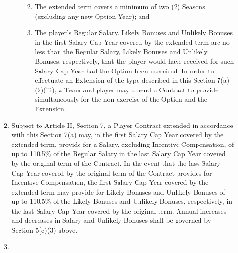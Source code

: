 \documentclass[
]{book}
\providecommand{\tightlist}{%
  \setlength{\itemsep}{0pt}\setlength{\parskip}{0pt}}
\begin{document}
\begin{enumerate}
\begin{enumerate}
\begin{enumerate}
      \begin{enumerate}
      \def\labelenumiv{(\Alph{enumiv})}
      \tightlist
      \item
        The extended term covers a minimum of two (2) Seasons (excluding any new Option Year); and
      \item
        The player's Regular Salary, Likely Bonuses and Unlikely Bonuses in the first Salary Cap Year covered by the extended term are no less than the Regular Salary, Likely Bonuses and Unlikely Bonuses, respectively, that the player would have received for such Salary Cap Year had the Option been exercised.
        In order to effectuate an Extension of the type described in this Section 7(a)(2)(iii), a Team and player may amend a Contract to provide simultaneously for the non-exercise of the Option and the Extension.
      \end{enumerate}
    \end{enumerate}
  \item
    Subject to Article II, Section 7, a Player Contract extended in accordance with this Section 7(a) may, in the first Salary Cap Year covered by the extended term, provide for a Salary, excluding Incentive Compensation, of up to 110.5\% of the Regular Salary in the last Salary Cap Year covered by the original term of the Contract. In the event that the last Salary Cap Year covered by the original term of the Contract provides for Incentive Compensation, the first Salary Cap Year covered by the extended term may provide for Likely Bonuses and Unlikely Bonuses of up to 110.5\% of the Likely Bonuses and Unlikely Bonuses, respectively, in the last Salary Cap Year covered by the original term. Annual increases and decreases in Salary and Unlikely Bonuses shall be governed by Section 5(c)(3) above.
  \item

\end{enumerate}
\end{enumerate}
\end{document}
